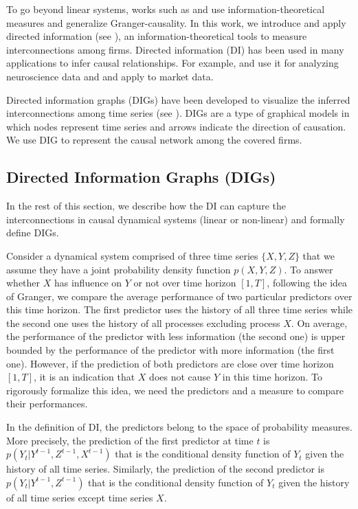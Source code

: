 To go beyond linear systems, works such as \citet{directed} and \citet{massey} use information-theoretical measures and generalize Granger-causality. 
In this work, we introduce and apply directed information (see \citet{directed}), an information-theoretical tools to measure interconnections among firms.
Directed information (DI) has been used in many applications to infer causal relationships. For example, \citet{spike} and \citet{di12} use it for analyzing neuroscience data and \citet{acc2014}  and \citet{etesami2018econometric} apply to market data. 


Directed information graphs (DIGs) have been developed to visualize the inferred interconnections among time series (see \citet{directed}).  
DIGs are a type of graphical models in which nodes represent time series and arrows indicate the direction of causation. We use DIG to represent the causal network among the covered firms. 



\subsection{Directed Information Graphs (DIGs)}\label{sec:dig}


In the rest of this section, we describe how the DI can capture the interconnections in causal dynamical systems (linear or non-linear) and formally define DIGs.

Consider a dynamical system comprised of three time series $\{X,Y,Z\}$ that we assume they have a joint probability density function $p(X,Y,Z)$. 
To answer whether $X$ has influence on $Y$ or not over time horizon $[1,T]$,  following the idea of Granger, we compare the average performance of two particular predictors over this time horizon. 
The first predictor uses the history of all three time series while the second one uses the history of all processes excluding process $X$. 
On average, the performance of the predictor with less information (the second one) is upper bounded by the performance of the predictor with more information  (the first one). 
However,  if the prediction of both predictors are close over time horizon $[1,T]$,  it is an indication that $X$ does not cause $Y$ in this time horizon.
To rigorously formalize this idea, we need the predictors and a measure to compare their performances.

In the definition of DI,  the predictors belong to the space of probability measures.  
More precisely,  
the prediction of the first predictor at time $t$ is $p(Y_t|Y^{t-1},Z^{t-1},X^{t-1})$ that is the conditional density function of $Y_t$ given the history of all time series. Similarly, the prediction of the second predictor is $p(Y_t|Y^{t-1},Z^{t-1})$ that is the conditional density function of $Y_t$ given the history of all time series except time series $X$.

